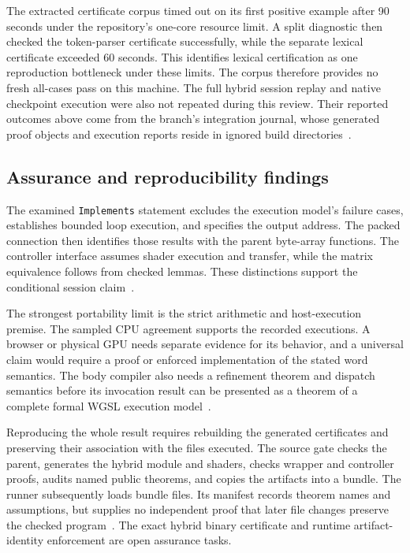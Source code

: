 \documentclass[11pt]{article}
\newcommand{\code}[1]{\texttt{#1}}
\begin{document}
The extracted certificate corpus timed out on its first positive example after 90 seconds under the repository's one-core resource limit.  A split diagnostic then checked the token-parser certificate successfully, while the separate lexical certificate exceeded 60 seconds.  This identifies lexical certification as one reproduction bottleneck under these limits.  The corpus therefore provides no fresh all-cases pass on this machine.  The full hybrid session replay and native checkpoint execution were also not repeated during this review.  Their reported outcomes above come from the branch's integration journal, whose generated proof objects and execution reports reside in ignored build directories~\cite{review,journal}.

\subsection{Assurance and reproducibility findings}

The examined \code{Implements} statement excludes the execution model's failure cases, establishes bounded loop execution, and specifies the output address.  The packed connection then identifies those results with the parent byte-array functions.  The controller interface assumes shader execution and transfer, while the matrix equivalence follows from checked lemmas.  These distinctions support the conditional session claim~\cite{execution,packedshader,backend}.

The strongest portability limit is the strict arithmetic and host-execution premise.  The sampled CPU agreement supports the recorded executions.  A browser or physical GPU needs separate evidence for its behavior, and a universal claim would require a proof or enforced implementation of the stated word semantics.  The body compiler also needs a refinement theorem and dispatch semantics before its invocation result can be presented as a theorem of a complete formal WGSL execution model~\cite{wgsl,execution}.

Reproducing the whole result requires rebuilding the generated certificates and preserving their association with the files executed.  The source gate checks the parent, generates the hybrid module and shaders, checks wrapper and controller proofs, audits named public theorems, and copies the artifacts into a bundle.  The runner subsequently loads bundle files.  Its manifest records theorem names and assumptions, but supplies no independent proof that later file changes preserve the checked program~\cite{build,host}.  The exact hybrid binary certificate and runtime artifact-identity enforcement are open assurance tasks.
\end{document}
